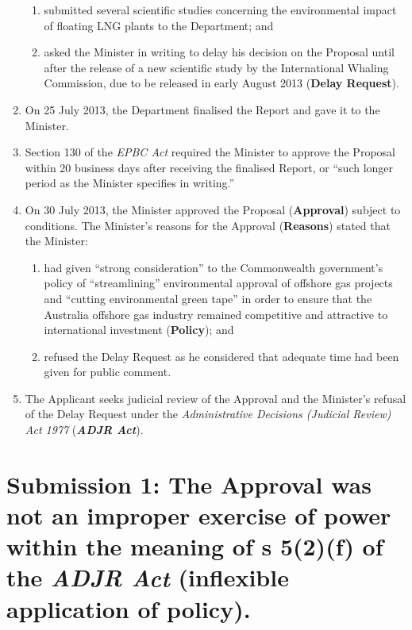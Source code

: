 \documentclass[12pt]{article}
\begin{document}
\begin{enumerate}[1.]
  \begin{enumerate}
  \item
    submitted several scientific studies concerning the environmental
    impact of floating LNG plants to the Department; and
  \item
    asked the Minister in writing to delay his decision on the Proposal
    until after the release of a new scientific study by the
    International Whaling Commission, due to be released in early August
    2013 (\textbf{Delay Request}).
  \end{enumerate}
\item
  On 25 July 2013, the Department finalised the Report and gave it to
  the Minister.
\item
  Section 130 of the \emph{EPBC Act} required the Minister to approve
  the Proposal within 20 business days after receiving the finalised
  Report, or ``such longer period as the Minister specifies in
  writing.''
\item
  On 30 July 2013, the Minister approved the Proposal
  (\textbf{Approval}) subject to conditions. The Minister's reasons for
  the Approval (\textbf{Reasons}) stated that the Minister:

  \begin{enumerate}
  \item
    had given ``strong consideration'' to the Commonwealth government's
    policy of ``streamlining'' environmental approval of offshore gas
    projects and ``cutting environmental green tape'' in order to ensure
    that the Australia offshore gas industry remained competitive and
    attractive to international investment (\textbf{Policy}); and
  \item
    refused the Delay Request as he considered that adequate time had
    been given for public comment.
  \end{enumerate}
\item
  The Applicant seeks judicial review of the Approval and the Minister's
  refusal of the Delay Request under the \emph{Administrative Decisions
  (Judicial Review) Act 1977} (\textbf{\emph{ADJR Act}}).
\end{enumerate}

\section{Submission 1: The Approval was not an improper exercise of
power within the meaning of s 5(2)(f) of the \emph{ADJR Act} (inflexible
application of policy).}
\end{document}
